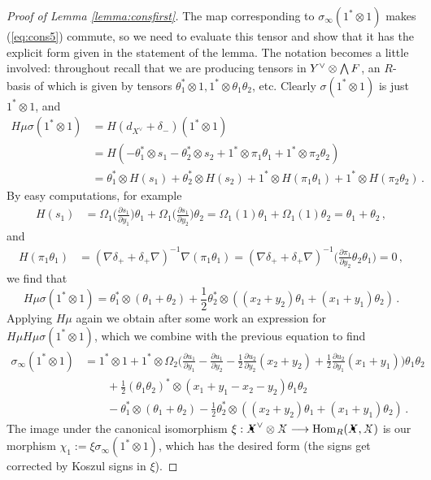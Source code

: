 \documentclass{compositio}
\theoremstyle{definition}
\numberwithin{equation}{section}
\def\Hom{\operatorname{Hom}}
\begin{document}
\begin{proof}[Proof of Lemma \ref{lemma:consfirst}]
The map corresponding to $\sigma_\infty(1^* \otimes 1)$ makes (\ref{eq:cons5}) commute, so we need to evaluate this tensor and show that it has the explicit form given in the statement of the lemma. The notation becomes a little involved: throughout recall that we are producing tensors in $Y^{\vee} \otimes \bigwedge F$, an $R$-basis of which is given by tensors $\theta_1^* \otimes 1, 1^* \otimes \theta_1\theta_2$, etc. Clearly $\sigma(1^* \otimes 1)$ is just $1^* \otimes 1$, and
\begin{align*}
H \mu \sigma(1^* \otimes 1) &= H( d_{X^{\lor}} + \delta_{-})(1^* \otimes 1)\\
&= H( -\theta_1^* \otimes s_1 - \theta_2^* \otimes s_2 + 1^* \otimes \pi_1 \theta_1 + 1^* \otimes \pi_2 \theta_2 )\\
&= \theta_1^* \otimes H(s_1) + \theta_2^* \otimes H(s_2) + 1^* \otimes H(\pi_1 \theta_1) + 1^* \otimes H(\pi_2 \theta_2) \, .
\end{align*}
By easy computations, for example
\begin{align*}
H(s_1) &= \Omega_1\Big( \frac{\partial s_1}{\partial y_1} \Big) \theta_1 + \Omega_1\Big( \frac{\partial s_1}{\partial y_2} \Big) \theta_2 = \Omega_1(1) \theta_1 + \Omega_1(1) \theta_2 = \theta_1 + \theta_2 \, ,
\end{align*}
and
\begin{align*}
H(\pi_1 \theta_1) &= (\nabla \delta_{+} + \delta_{+} \nabla)^{-1} \nabla( \pi_1 \theta_1 ) = (\nabla \delta_{+} + \delta_{+} \nabla)^{-1}\Big( \frac{\partial \pi_1}{\partial y_2} \theta_2 \theta_1 \Big) = 0 \, ,
\end{align*}
we find that
$$
H \mu \sigma(1^* \otimes 1) = \theta_1^* \otimes (\theta_1 + \theta_2) + \frac{1}{2}\theta_2^* \otimes ( (x_2 + y_2) \theta_1 + (x_1 + y_1) \theta_2) \, .
$$
Applying $H\mu$ again we obtain after some work an expression for $H\mu H\mu\sigma(1^* \otimes 1)$, which we combine with the previous equation to find
\begin{align*}
\sigma_\infty(1^* \otimes 1) &= 1^* \otimes 1 + 1^* \otimes \Omega_2\Big( \frac{\partial u_1}{\partial y_1} - \frac{\partial u_1}{\partial y_2} - \frac{1}{2} \frac{\partial u_2}{\partial y_2}(x_2 + y_2) + \frac{1}{2} \frac{\partial u_2}{\partial y_1}(x_1 + y_1) \Big)\theta_1 \theta_2  \\
& \qquad+  \frac{1}{2}(\theta_1 \theta_2)^* \otimes (x_1 + y_1 - x_2 - y_2) \theta_1 \theta_2  \\
& \qquad- \theta_1^* \otimes (\theta_1 + \theta_2) - \frac{1}{2} \theta_2^* \otimes ( (x_2+y_2)\theta_1 + (x_1+y_1)\theta_2 ) \, . 
\end{align*}
The image under the canonical isomorphism $\xi: \Xbul\mdual \otimes \Xcirc \lto \Hom_R(\Xbul, \Xcirc)$ is our morphism $\chi_1 := \xi \sigma_\infty(1^* \otimes 1)$, which has the desired form (the signs get corrected by Koszul signs in $\xi$).
\end{proof}
\end{document}
